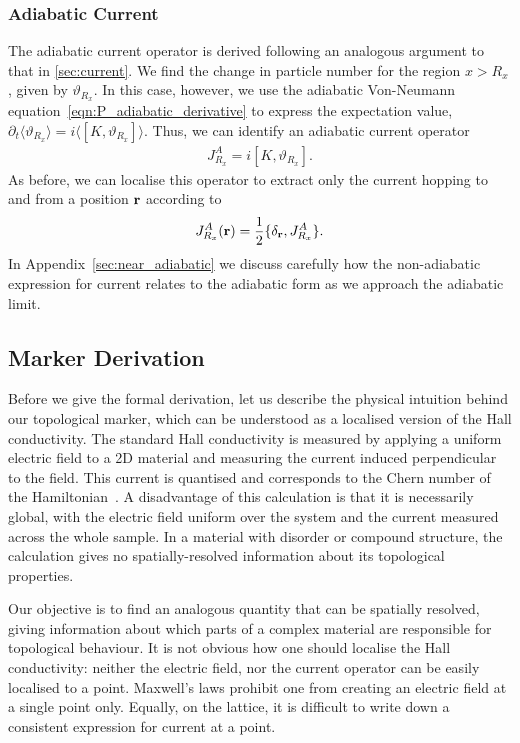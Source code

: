 \subsubsection{Adiabatic Current}\label{sec:kato_current}

The adiabatic current operator is derived following an analogous argument to that in \textsection\ref{sec:current}. We find the change in particle number for the region $x>R_x$, given by $\vartheta_{R_x}$. In this case, however, we use the adiabatic Von-Neumann equation~\ref{eqn:P_adiabatic_derivative} to express the expectation value, $\partial_t \langle \vartheta_{R_x} \rangle = i \langle [K, \vartheta_{R_x}] \rangle$. Thus, we can identify an adiabatic current operator 
\begin{align}
    J_{R_x}^A = i [K,\vartheta_{R_x}].
\end{align}
As before, we can localise this operator to extract only the current hopping to and from a position $\textbf r$ according to 
\begin{align}\label{eqn:local_adiabatic_current}
    J^A_{R_x} (\textbf r) = \frac{1}{2} \{\delta_{\textbf r}, J_{R_x}^A \}.
\end{align}
In Appendix~\ref{sec:near_adiabatic} we discuss carefully how the non-adiabatic expression for current relates to the adiabatic form as we approach the adiabatic limit.

\subsection{Marker Derivation}\label{sec:marker_derivation}

Before we give the formal derivation, let us describe the physical intuition behind our topological marker, which can be understood as a localised version of the Hall conductivity. The standard Hall conductivity is measured by applying a uniform electric field to a 2D material and measuring the current induced perpendicular to the field. This current is quantised and corresponds to the Chern number of the Hamiltonian~\cite{laughlin_quantized_1981}. A disadvantage of this calculation is that it is necessarily global, with the electric field uniform over the system and the current measured across the whole sample. In a material with disorder or compound structure, the calculation gives no spatially-resolved information about its topological properties.

Our objective is to find an analogous quantity that can be spatially resolved, giving information about which parts of a complex material are responsible for topological behaviour. It is not obvious how one should localise the Hall conductivity: neither the electric field, nor the current operator can be easily localised to a point. Maxwell's laws prohibit one from creating an electric field at a single point only. Equally, on the lattice, it is difficult to write down a consistent expression for current at a point.

